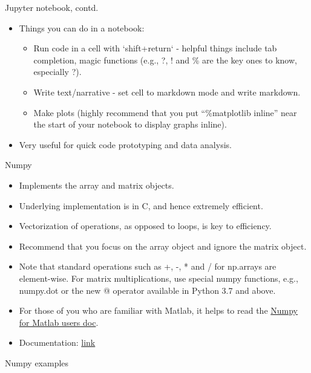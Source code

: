 \documentclass[aspectratio=169]{beamer}
\begin{document}
    \begin{frame}{Jupyter notebook, contd.}
        \begin{itemize}
            \item Things you can do in a notebook:
            \begin{itemize}
                \item Run code in a cell with `shift+return` - helpful things include tab completion, magic functions (e.g., ?, ! and \% are the key ones to know, especially ?).
                \item Write text/narrative - set cell to markdown mode and write markdown.
                \item Make plots (highly recommend that you put ``\%matplotlib inline'' near the start of your notebook to display graphs inline).
            \end{itemize}
            \item Very useful for quick code prototyping and data analysis.
        \end{itemize}
    \end{frame}


    \begin{frame}{Numpy}
        \begin{itemize}
            \item Implements the array and matrix objects.
            \item Underlying implementation is in C, and hence extremely efficient.
            \item Vectorization of operations, as opposed to loops, is key to efficiency.
            \item Recommend that you focus on the array object and ignore the matrix object.
            \item Note that standard operations such as +, -, * and / for np.arrays are element-wise. For matrix multiplications, use special numpy functions, e.g., numpy.dot or the new @ operator available in Python 3.7 and above.
            \item For those of you who are familiar with Matlab, it helps to read the \href{https://docs.scipy.org/doc/numpy/user/numpy-for-matlab-users.html}{Numpy for Matlab users doc}.
            \item Documentation: \href{http://docs.scipy.org/doc/numpy/}{link}
        \end{itemize}
    \end{frame}


    \begin{frame}[fragile]{Numpy examples}
        \inputminted{python}{example_numpy.py}
    \end{frame}
\end{document}
